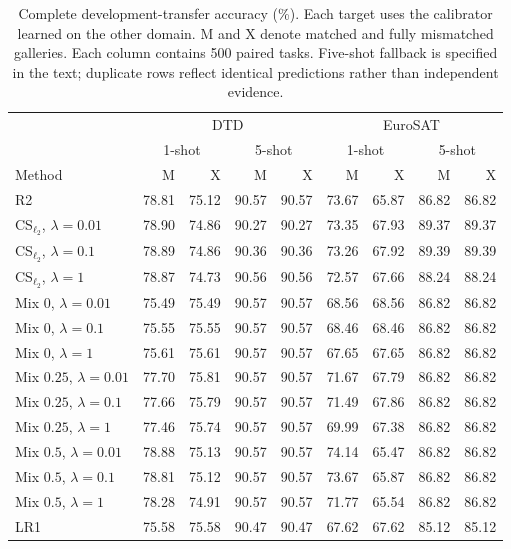 \begin{table}[ht]
\centering
\caption{Complete development-transfer accuracy (\%). Each target uses the calibrator learned on the other domain. M and X denote matched and fully mismatched galleries. Each column contains 500 paired tasks. Five-shot fallback is specified in the text; duplicate rows reflect identical predictions rather than independent evidence.}\label{tab:calibration-accuracy}
\small\setlength{\tabcolsep}{3pt}
\begin{tabular}{lrrrrrrrr}\toprule
& \multicolumn{4}{c}{DTD} & \multicolumn{4}{c}{EuroSAT} \\
& \multicolumn{2}{c}{1-shot} & \multicolumn{2}{c}{5-shot}
& \multicolumn{2}{c}{1-shot} & \multicolumn{2}{c}{5-shot} \\
Method & M & X & M & X & M & X & M & X \\\midrule
R2 & 78.81 & 75.12 & 90.57 & 90.57 & 73.67 & 65.87 & 86.82 & 86.82 \\
CS$_{\ell_2}$, $\lambda=0.01$ & 78.90 & 74.86 & 90.27 & 90.27 & 73.35 & 67.93 & 89.37 & 89.37 \\
CS$_{\ell_2}$, $\lambda=0.1$ & 78.89 & 74.86 & 90.36 & 90.36 & 73.26 & 67.92 & 89.39 & 89.39 \\
CS$_{\ell_2}$, $\lambda=1$ & 78.87 & 74.73 & 90.56 & 90.56 & 72.57 & 67.66 & 88.24 & 88.24 \\
Mix $0$, $\lambda=0.01$ & 75.49 & 75.49 & 90.57 & 90.57 & 68.56 & 68.56 & 86.82 & 86.82 \\
Mix $0$, $\lambda=0.1$ & 75.55 & 75.55 & 90.57 & 90.57 & 68.46 & 68.46 & 86.82 & 86.82 \\
Mix $0$, $\lambda=1$ & 75.61 & 75.61 & 90.57 & 90.57 & 67.65 & 67.65 & 86.82 & 86.82 \\
Mix $0.25$, $\lambda=0.01$ & 77.70 & 75.81 & 90.57 & 90.57 & 71.67 & 67.79 & 86.82 & 86.82 \\
Mix $0.25$, $\lambda=0.1$ & 77.66 & 75.79 & 90.57 & 90.57 & 71.49 & 67.86 & 86.82 & 86.82 \\
Mix $0.25$, $\lambda=1$ & 77.46 & 75.74 & 90.57 & 90.57 & 69.99 & 67.38 & 86.82 & 86.82 \\
Mix $0.5$, $\lambda=0.01$ & 78.88 & 75.13 & 90.57 & 90.57 & 74.14 & 65.47 & 86.82 & 86.82 \\
Mix $0.5$, $\lambda=0.1$ & 78.81 & 75.12 & 90.57 & 90.57 & 73.67 & 65.87 & 86.82 & 86.82 \\
Mix $0.5$, $\lambda=1$ & 78.28 & 74.91 & 90.57 & 90.57 & 71.77 & 65.54 & 86.82 & 86.82 \\
LR1 & 75.58 & 75.58 & 90.47 & 90.47 & 67.62 & 67.62 & 85.12 & 85.12 \\

\end{tabular}
\end{table}
